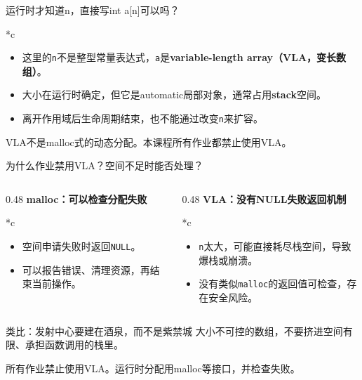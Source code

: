 \begin{frame}{运行时才知道n，直接写int a[n]可以吗？}
\begin{Code}*{c}\end{Code}
\begin{itemize}
    \item 这里的\texttt{n}不是整型常量表达式，\texttt{a}是\textbf{variable-length array（VLA，变长数组）}。
    \item 大小在运行时确定，但它是automatic局部对象，通常占用\textbf{stack}空间。
    \item 离开作用域后生命周期结束，也不能通过改变\texttt{n}来扩容。
\end{itemize}
\medskip\alert{VLA不是malloc式的动态分配。本课程所有作业都禁止使用VLA。}
\end{frame}

\begin{frame}{为什么作业禁用VLA？空间不足时能否处理？}
\begin{columns}[T]
\begin{column}{0.48\textwidth}
\textbf{malloc：可以检查分配失败}
\begin{Code}*{c}\end{Code}
\begin{itemize}
    \item 空间申请失败时返回\texttt{NULL}。
    \item 可以报告错误、清理资源，再结束当前操作。
\end{itemize}
\end{column}
\begin{column}{0.48\textwidth}
\textbf{VLA：没有NULL失败返回机制}
\begin{Code}*{c}\end{Code}
\begin{itemize}
    \item \texttt{n}太大，可能直接耗尽栈空间，导致爆栈或崩溃。
    \item 没有类似\texttt{malloc}的返回值可检查，存在安全风险。
\end{itemize}
\end{column}
\end{columns}
\medskip
\begin{vspquotered}{类比：发射中心要建在酒泉，而不是紫禁城}
    \small 大小不可控的数组，不要挤进空间有限、承担函数调用的栈里。
\end{vspquotered}
\small\alert{所有作业禁止使用VLA。运行时分配用malloc等接口，并检查失败。}
\end{frame}

